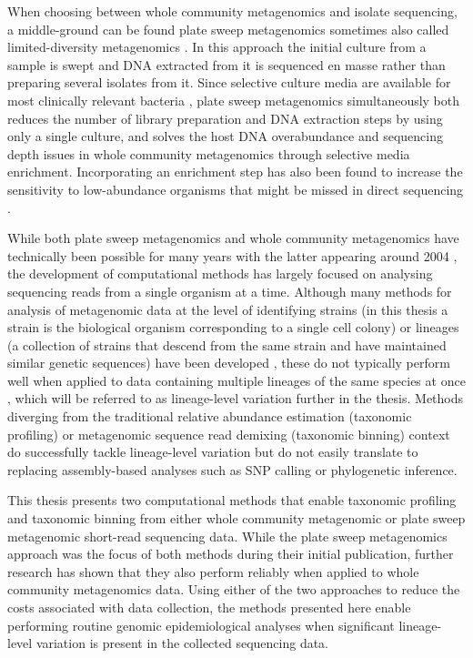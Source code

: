 \documentclass[officiallayout]{tktla}
\begin{document}
When choosing between whole community metagenomics and isolate sequencing, a
middle-ground can be found plate sweep metagenomics
\cite{maklin_high-resolution_2021} \textemdash{ } sometimes also
called limited-diversity metagenomics \citep{cocker_drivers_2022}. In
this approach the initial culture from a sample is swept and DNA
extracted from it is sequenced en masse rather than preparing several
isolates from it. Since selective culture media are available for most
clinically relevant bacteria \citep{lagier2015current}, plate sweep
metagenomics simultaneously both reduces the number of library
preparation and DNA extraction steps by using only a single culture,
and solves the host DNA overabundance and sequencing depth issues in
whole community metagenomics through selective media enrichment. Incorporating an
enrichment step has also been found to increase the sensitivity to
low-abundance organisms that might be missed in direct sequencing
\citep{whelan2020culture}.

While both plate sweep metagenomics and whole community metagenomics have
technically been possible for many years with the latter appearing
around 2004 \citep{tyson2004community, venter2004environmental}, the
development of computational methods has largely focused on analysing
sequencing reads from a single organism at a time. Although many
methods for analysis of metagenomic data at the level of identifying
strains (in this thesis a strain is the biological organism
corresponding to a single cell colony) or lineages (a collection of
strains that descend from the same strain and have maintained similar
genetic sequences) have been developed \citep{breitwieser2019review},
these do not typically perform well when applied to data containing
multiple lineages of the same species at once
\citep{sczyrba2017critical}, which will be referred to as
lineage-level variation further in the thesis. Methods diverging from
the traditional relative abundance estimation (taxonomic profiling)
\citep{truong2017microbial} or metagenomic sequence read demixing
(taxonomic binning) \citep{van2022strainge} context do successfully
tackle lineage-level variation but do not easily translate to replacing
assembly-based analyses such as SNP calling or phylogenetic inference.

This thesis presents two computational methods that enable
taxonomic profiling and taxonomic binning from either whole community metagenomic
or plate sweep metagenomic short-read sequencing data. While the plate
sweep metagenomics approach was the focus of both methods during their
initial publication, further research has shown that they also perform reliably
when applied to whole community metagenomics data. Using either of the two
approaches to reduce the costs associated with data collection, the
methods presented here enable performing routine genomic
epidemiological analyses when significant lineage-level variation is
present in the collected sequencing data.
\end{document}
